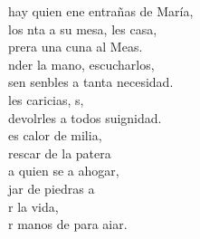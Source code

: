 \begin{cancion}
	hay quien ene entrañas de María,\\
	los nta a su mesa, les casa,\\
	prera una cuna al Meas. \\
	nder la mano, escucharlos,\\
	sen senbles a tanta necesidad.\\
	les caricias, s,\\
	devolrles a todos suignidad.\\
	es calor de milia,\\
	rescar de la patera \\
	a quien se  a ahogar,\\
	jar de  piedras a\\
	r la vida,\\
	r manos de  para aiar.\\
\end{cancion}%
